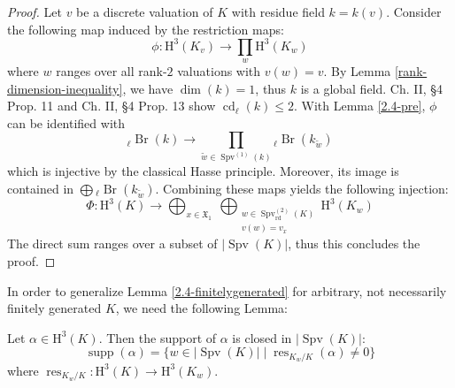 \begin{proof}
Let $v$ be a discrete valuation of $K$ with residue field $k=k(v)$. Consider the following map induced by the restriction maps: 
\[ \phi: \mathrm{H}^3(K_v) \longrightarrow \prod_w\mathrm{H}^3(K_w) \]
where $w$ ranges over all rank-$2$ valuations with $v(w) = v$. By Lemma \ref{rank-dimension-inequality}, we have $\dim(k) = 1$, thus $k$ is a global field. \cite{Se64} Ch. II, §4 Prop. 11 and \cite{Se64} Ch. II, §4 Prop. 13 show $\operatorname{cd}_\ell(k)\leq 2$. With Lemma \ref{2.4-pre}, $\phi$ can be identified with
\[ {}_\ell\operatorname{Br}(k) \longrightarrow \prod_{\widetilde{w}\in\operatorname{Spv}^{(1)}(k)} {}_\ell\operatorname{Br}(k_{\widetilde{w}}) \]
which is injective by the classical Hasse principle. Moreover, its image is contained in $\bigoplus {}_\ell\operatorname{Br}(k_{\widetilde{w}})$. Combining these maps yields the following injection:
\[\Phi: \mathrm{H}^3(K)\longrightarrow \bigoplus_{x\in\mathfrak{X}_1}\  \bigoplus_{\substack{w\in\operatorname{Spv}_\text{rd}^{(2)}(K) \\ v(w) = v_x}} \mathrm{H}^3(K_w) \]
The direct sum ranges over a subset of $|\operatorname{Spv}(K)|$, thus this concludes the proof. 
\end{proof}

In order to generalize Lemma \ref{2.4-finitelygenerated} for arbitrary, not necessarily finitely generated $K$, we need the following Lemma:

\begin{lemma}\label{2.4-closedset}
Let $\alpha\in\mathrm{H}^3(K)$. Then the support of $\alpha$ is closed in $|\operatorname{Spv}(K)|$:
\[ \operatorname{supp}(\alpha) = \{w\in |\operatorname{Spv}(K)|\mid \operatorname{res}_{K_w/K}(\alpha)\neq 0 \} \]
where $\operatorname{res}_{K_w/K}: \mathrm{H}^3(K)\to \mathrm{H}^3(K_w)$.
\end{lemma}

